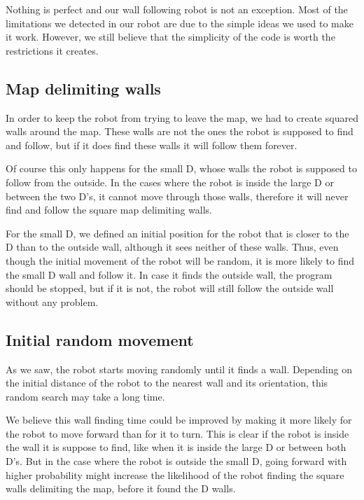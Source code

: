 \documentclass[10pt,journal,compsoc]{IEEEtran}
\begin{document}
Nothing is perfect and our wall following robot is not an exception. Most of the limitations we detected in our robot are due to the simple ideas we used to make it work. However, we still believe that the simplicity of the code is worth the restrictions it creates.

\subsection{Map delimiting walls}\label{subsec:map_delimiting_walls}

In order to keep the robot from trying to leave the map, we had to create squared walls around the map. These walls are not the ones the robot is supposed to find and follow, but if it does find these walls it will follow them forever.

Of course this only happens for the small D, whose walls the robot is supposed to follow from the outside. In the cases where the robot is inside the large D or between the two D's, it cannot move through those walls, therefore it will never find and follow the square map delimiting walls.

For the small D, we defined an initial position for the robot that is closer to the D than to the outside wall, although it sees neither of these walls. Thus, even though the initial movement of the robot will be random, it is more likely to find the small D wall and follow it. In case it finds the outside wall, the program should be stopped, but if it is not, the robot will still follow the outside wall without any problem.

\subsection{Initial random movement}

As we saw, the robot starts moving randomly until it finds a wall. Depending on the initial distance of the robot to the nearest wall and its orientation, this random search may take a long time. 

We believe this wall finding time could be improved by making it more likely for the robot to move forward than for it to turn. This is clear if the robot is inside the wall it is suppose to find, like when it is inside the large D or between both D's. But in the case where the robot is outside the small D, going forward with higher probability might increase the likelihood of the robot finding the square walls delimiting the map, before it found the D walls.
\end{document}
